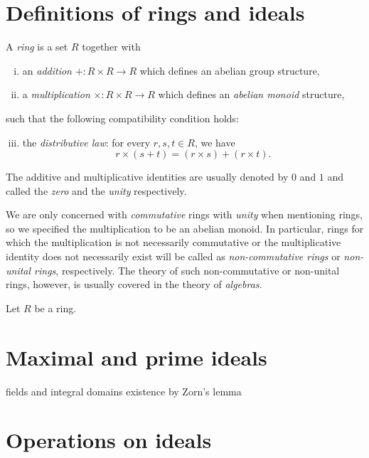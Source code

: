 \documentclass{../../large}
\begin{document}
\section{Definitions of rings and ideals}
\begin{prb}
A \emph{ring} is a set $R$ together with
\begin{enumerate}[(i)]
\item an \emph{addition} $+:R\times R\to R$ which defines an abelian group structure,
\item a \emph{multiplication} $\times:R\times R\to R$ which defines an \emph{abelian monoid} structure,
\end{enumerate}
such that the following compatibility condition holds:
\begin{enumerate}[(i)]\setcounter{enumi}{2}
\item the \emph{distributive law}: for every $r,s,t\in R$, we have
\[r\times(s+t)=(r\times s)+(r\times t).\]
\end{enumerate}
The additive and multiplicative identities are usually denoted by $0$ and $1$ and called the \emph{zero} and the \emph{unity} respectively.

We are only concerned with \emph{commutative} rings with \emph{unity} when mentioning rings, so we specified the multiplication to be an abelian monoid.
In particular, rings for which the multiplication is not necessarily commutative or the multiplicative identity does not necessarily exist will be called as \emph{non-commutative rings} or \emph{non-unital rings}, respectively.
The theory of such non-commutative or non-unital rings, however, is usually covered in the theory of \emph{algebras}.
\end{prb}


\begin{prb}
Let $R$ be a ring.
\end{prb}

\begin{prb}
\end{prb}
\begin{prb}
\end{prb}


\section{Maximal and prime ideals}
fields and integral domains
existence by Zorn's lemma

\section{Operations on ideals}
\end{document}
